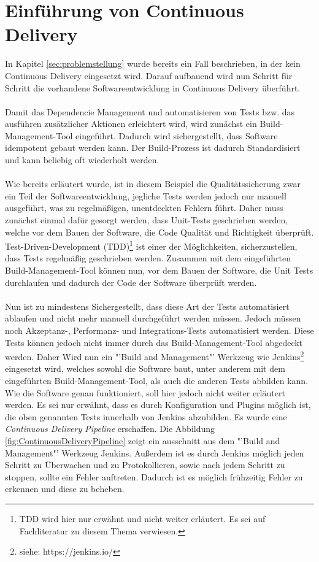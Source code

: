 \section{Einführung von Continuous Delivery}
\label{sec:EinfuehrungCD}
In Kapitel \ref{sec:problemstellung}  wurde bereits ein Fall beschrieben, in der kein Continuous Delivery eingesetzt wird. Darauf aufbauend wird nun Schritt für Schritt die vorhandene Softwareentwicklung in Continuous Delivery überführt.
\\\\
Damit das Dependencie Management und automatisieren von Tests bzw. das ausführen zusätzlicher Aktionen erleichtert wird, wird zunächst ein Build-Management-Tool eingeführt. Dadurch wird sichergestellt, dass Software idempotent gebaut werden kann. Der Build-Prozess ist dadurch Standardisiert und kann beliebig oft wiederholt werden.
\\\\
Wie bereits erläutert wurde, ist in diesem Beispiel die Qualitätssicherung zwar ein Teil der Softwareentwicklung, jegliche Tests werden jedoch nur manuell ausgeführt, was zu regelmäßigen, unentdeckten Fehlern führt. Daher muss zunächst einmal dafür gesorgt werden, dass Unit-Tests geschrieben werden, welche vor dem Bauen der Software, die Code Qualität und Richtigkeit überprüft.  Test-Driven-Development (TDD)\footnote{TDD wird hier nur erwähnt und nicht weiter erläutert. Es sei auf Fachliteratur zu diesem Thema verwiesen.} ist einer der Möglichkeiten, sicherzustellen, dass Tests regelmäßig geschrieben werden. Zusammen mit dem eingeführten Build-Management-Tool können nun, vor dem Bauen der Software, die Unit Tests durchlaufen und dadurch der Code der Software überprüft werden.
\\\\
Nun ist zu mindestens Sichergestellt, dass diese Art der Tests automatisiert ablaufen und nicht mehr manuell durchgeführt werden müssen. Jedoch müssen noch Akzeptanz-, Performanz- und Integrations-Tests automatisiert werden. Diese Tests können jedoch nicht immer durch das Build-Management-Tool abgedeckt werden. Daher Wird nun ein "'Build and Management"' Werkzeug wie Jenkins\footnote{siehe: https://jenkins.io/} eingesetzt wird, welches sowohl die Software baut, unter anderem mit dem eingeführten Build-Management-Tool, als auch die anderen Tests abbilden kann. Wie die Software genau funktioniert, soll hier jedoch nicht weiter erläutert werden. Es sei nur erwähnt, dass es durch Konfiguration und Plugins möglich ist, die oben genannten Tests innerhalb von Jenkins abzubilden. Es wurde eine \textit{Continuous Delivery Pipeline} erschaffen. Die Abbildung \ref{fig:ContinuousDeliveryPipeline}  zeigt ein ausschnitt aus dem "'Build and Management"' Werkzeug Jenkins. Außerdem ist es durch Jenkins möglich jeden Schritt zu Überwachen und zu Protokollieren, sowie nach jedem Schritt zu stoppen, sollte ein Fehler auftreten. Dadurch ist es möglich frühzeitig Fehler zu erkennen und diese zu beheben.
